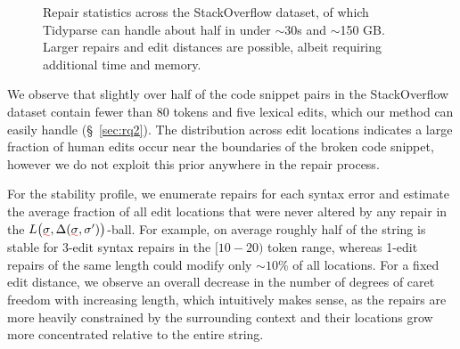 \documentclass[sigplan,acmsmall,nonacm,screen]{acmart}\settopmatter{printfolios=false,printccs=false,printacmref=false}
\begin{document}
\begin{figure}[h!]
    \caption{Repair statistics across the StackOverflow dataset, of which Tidyparse can handle about half in under $\sim$30s and $\sim$150 GB. Larger repairs and edit distances are possible, albeit requiring additional time and memory.}\label{fig:patch_stats}
  \end{figure}

  We observe that slightly over half of the code snippet pairs in the StackOverflow dataset contain fewer than 80 tokens and five lexical edits, which our method can easily handle (\S~\ref{sec:rq2}). The distribution across edit locations indicates a large fraction of human edits occur near the boundaries of the broken code snippet, however we do not exploit this prior anywhere in the repair process.

  For the stability profile, we enumerate repairs for each syntax error and estimate the average fraction of all edit locations that were never altered by any repair in the $L\big(\err\sigma, \Delta(\err\sigma, \sigma')\big)$-ball. For example, on average roughly half of the string is stable for 3-edit syntax repairs in the $[10-20)$ token range, whereas 1-edit repairs of the same length could modify only $\sim 10\%$ of all locations. For a fixed edit distance, we observe an overall decrease in the number of degrees of caret freedom with increasing length, which intuitively makes sense, as the repairs are more heavily constrained by the surrounding context and their locations grow more concentrated relative to the entire string.


\end{document}
